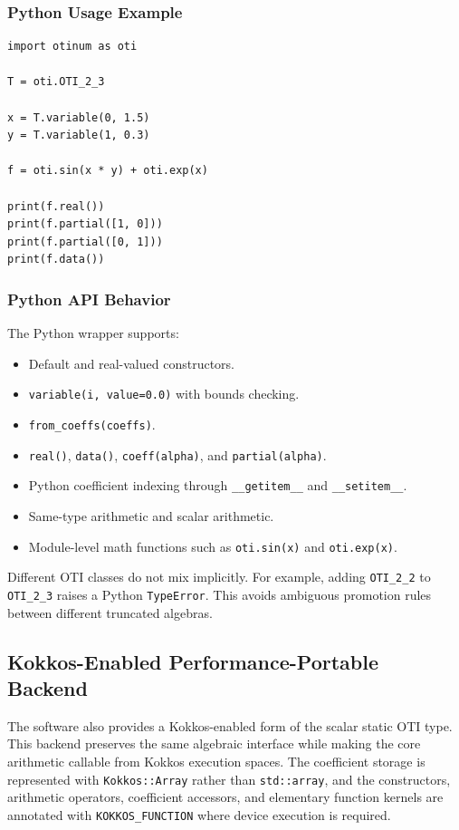 \documentclass[11pt]{article}
\begin{document}
\subsubsection{Python Usage Example}

\begin{lstlisting}[style=pythonstyle]
import otinum as oti

T = oti.OTI_2_3

x = T.variable(0, 1.5)
y = T.variable(1, 0.3)

f = oti.sin(x * y) + oti.exp(x)

print(f.real())
print(f.partial([1, 0]))
print(f.partial([0, 1]))
print(f.data())
\end{lstlisting}

\subsubsection{Python API Behavior}

The Python wrapper supports:

\begin{itemize}[noitemsep]
    \item Default and real-valued constructors.
    \item \texttt{variable(i, value=0.0)} with bounds checking.
    \item \texttt{from\_coeffs(coeffs)}.
    \item \texttt{real()}, \texttt{data()}, \texttt{coeff(alpha)}, and
    \texttt{partial(alpha)}.
    \item Python coefficient indexing through \texttt{\_\_getitem\_\_} and
    \texttt{\_\_setitem\_\_}.
    \item Same-type arithmetic and scalar arithmetic.
    \item Module-level math functions such as \texttt{oti.sin(x)} and
    \texttt{oti.exp(x)}.
\end{itemize}

Different OTI classes do not mix implicitly. For example, adding
\texttt{OTI\_2\_2} to \texttt{OTI\_2\_3} raises a Python \texttt{TypeError}.
This avoids ambiguous promotion rules between different truncated algebras.

\subsection{Kokkos-Enabled Performance-Portable Backend}

The software also provides a Kokkos-enabled form of the scalar static OTI
type. This backend preserves the same algebraic interface while making the
core arithmetic callable from Kokkos execution spaces. The coefficient storage
is represented with \texttt{Kokkos::Array} rather than \texttt{std::array}, and
the constructors, arithmetic operators, coefficient accessors, and elementary
function kernels are annotated with \texttt{KOKKOS\_FUNCTION} where device
execution is required.
\end{document}
